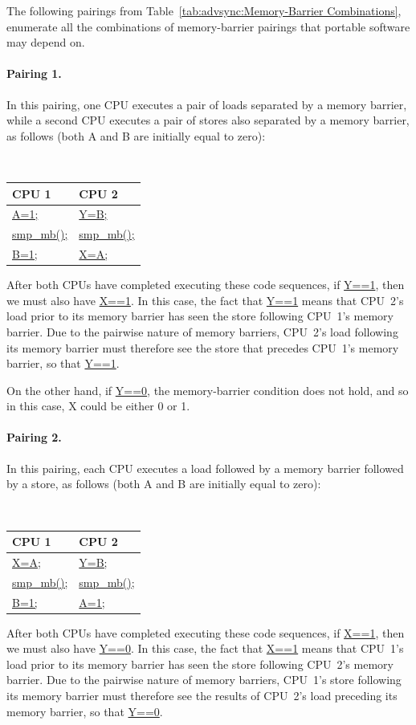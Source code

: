 The following pairings from
Table~\ref{tab:advsync:Memory-Barrier Combinations},
enumerate all the combinations of memory-barrier
pairings that portable software may depend on.

\paragraph{Pairing 1.}
	In this pairing, one CPU executes a pair of loads separated
	by a memory barrier, while a second CPU executes a pair
	of stores also separated by a memory barrier, as follows
	(both A and B are initially equal to zero):
	\vspace{5pt}
	\begin{minipage}[t]{\columnwidth}
	\tt
	\begin{tabular}{l|l}
		CPU 1 &			CPU 2 \\
		\hline
		\url{A=1;} &		\url{Y=B;} \\
		\url{smp_mb();} &	\url{smp_mb();} \\
		\url{B=1;} &		\url{X=A;} \\
	\end{tabular}
	\end{minipage}
	\vspace{5pt}
	After both CPUs have completed executing these code sequences,
	if \url{Y==1}, then we must also have \url{X==1}.
	In this case, the fact that \url{Y==1} means that
	CPU~2's load prior to its memory barrier has
	seen the store following CPU~1's memory barrier.
	Due to the pairwise nature of memory barriers, CPU~2's
	load following its memory barrier must therefore see
	the store that precedes CPU~1's memory barrier, so that
	\url{Y==1}.

	On the other hand, if \url{Y==0}, the memory-barrier condition
	does not hold, and so in this case, X could be either 0 or 1.

\paragraph{Pairing 2.}
	In this pairing, each CPU executes a load followed by a
	memory barrier followed by a store, as follows
	(both A and B are initially equal to zero):
	\vspace{5pt}
	\begin{minipage}[t]{\columnwidth}
	\tt
	\begin{tabular}{l|l}
		CPU 1 &			CPU 2 \\
		\hline
		\url{X=A;} &		\url{Y=B;} \\
		\url{smp_mb();} &	\url{smp_mb();} \\
		\url{B=1;} &		\url{A=1;} \\
	\end{tabular}
	\end{minipage}
	\vspace{5pt}
	After both CPUs have completed executing these code sequences,
	if \url{X==1}, then we must also have \url{Y==0}.
	In this case, the fact that \url{X==1} means that
	CPU~1's load prior to its memory barrier has
	seen the store following CPU~2's memory barrier.
	Due to the pairwise nature of memory barriers, CPU~1's
	store following its memory barrier must therefore see
	the results of CPU~2's load preceding its memory barrier,
	so that \url{Y==0}.

